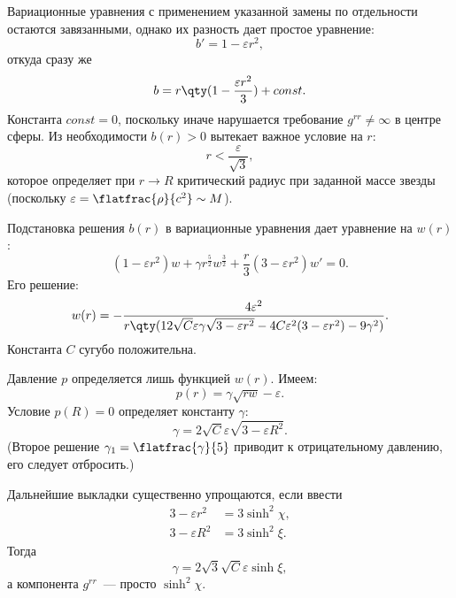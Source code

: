 \documentclass[\docroot/reports/draft/report.tex]{subfiles}
\begin{document}
    Вариационные уравнения с применением указанной замены по отдельности остаются завязанными, однако их разность дает простое уравнение:
    \begin{equation*}
        b' = 1 - \varepsilon r^2 ,
    \end{equation*}
    откуда сразу же
    \begin{equation*}
        b = r \qty(1 - \frac{\varepsilon r^2}{3}) + const .
    \end{equation*}
    Константа $const = 0$, поскольку иначе нарушается требование $g^{rr} \neq \infty$ в центре сферы. Из необходимости $b(r) > 0$ вытекает важное условие на $r$:
    \begin{equation*}
        r < \frac{\varepsilon}{\sqrt{3}} ,
    \end{equation*}
    которое определяет при $r \to R$ критический радиус при заданной массе звезды (поскольку $\varepsilon = \flatfrac{\rho}{c^2} \sim M$).

    Подстановка решения $b(r)$ в вариационные уравнения дает уравнение на $w(r)$:
    \begin{equation*}
        (1 - \varepsilon r^2) w + \gamma r^\frac{5}{2} w^\frac{3}{2} + \frac{r}{3} (3 - \varepsilon r^2) w' = 0 .
    \end{equation*}
    Его решение:
    \begin{equation*}
        w(r) = - \frac{4 \varepsilon^2}{
            r \qty(
                12 \sqrt{C} \varepsilon \gamma \sqrt{3 - \varepsilon r^2} - 4 C \varepsilon^2 (3 - \varepsilon r^2) - 9 \gamma^2
            )
        } .
    \end{equation*}
    Константа $C$ сугубо положительна.

    Давление $p$ определяется лишь функцией $w(r)$. Имеем:
    \begin{equation*}
        p(r) = \gamma \sqrt{r w} - \varepsilon .
    \end{equation*}
    Условие $p(R) = 0$ определяет константу $\gamma$:
    \begin{equation*}
        \gamma = 2 \sqrt{C} \varepsilon \sqrt{3 - \varepsilon R^2} .
    \end{equation*}
    (Второе решение $\gamma_1 = \flatfrac{\gamma}{5}$ приводит к отрицательному давлению, его следует отбросить.)

    Дальнейшие выкладки существенно упрощаются, если ввести
    \begin{align*}
        3 - \varepsilon r^2 &= 3 \sinh^2\chi , \\
        3 - \varepsilon R^2 &= 3 \sinh^2\xi .
    \end{align*}
    Тогда
    \begin{equation*}
        \gamma = 2 \sqrt{3} \sqrt{C} \varepsilon \sinh\xi ,
    \end{equation*}
    а компонента $g^{rr}$~--- просто $\sinh^2\chi$.
\end{document}
